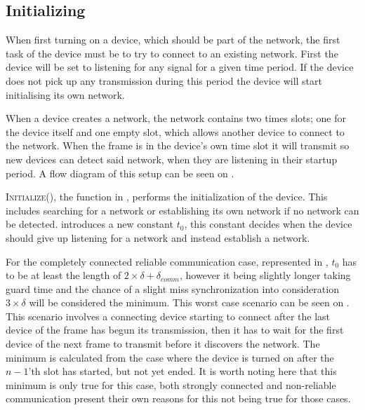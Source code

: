 \subsection{Initializing} %
\label{sub:setupCCRC} 
When first turning on a device, which should be part of the network, the first task of the device must be to try to connect to an existing network.
First the device will be set to listening for any signal for a given time period. 
If the device does not pick up any transmission during this period the device will start initialising its own network.

When a device creates a network, the network contains two times slots; one for the device itself and one empty slot, which allows another device to connect to the network.
When the frame is in the device's own time slot it will transmit so new devices can detect said network, when they are listening in their startup period.  
A flow diagram of this setup can be seen on .

 
\noindent
\textsc{Initialize()}, the function in , performs the initialization of the device.
This includes searching for a network or establishing its own network if no network can be detected.
 introduces a new constant $t_0$, this constant decides when the device should give up listening for a network and instead establish a network.

For the completely connected reliable communication case, represented in , $t_0$ has to be at least the length of $2 \times \delta + \delta_{comm}$, however it being slightly longer taking guard time and the chance of a slight miss synchronization into consideration $3 \times \delta$ will be considered the minimum. 
This worst case scenario can be seen on .
This scenario involves a connecting device starting to connect after the last device of the frame has begun its transmission, then it has to wait for the first device of the next frame to transmit before it discovers the network. 
The minimum is calculated from the case where the device is turned on after the $n-1$'th slot has started, but not yet ended.
It is worth noting here that this minimum is only true for this case, both strongly connected and non-reliable communication present their own reasons for this not being true for those cases.

